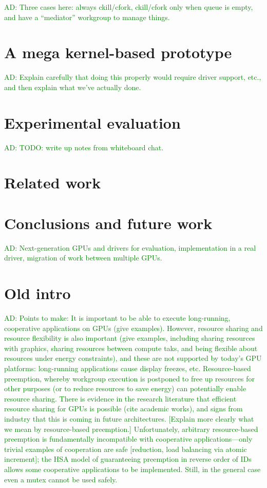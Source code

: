 \documentclass[nocopyrightspace]{sigplanconf-pldi16}
\newcommand{\ADComment}[1]{\textcolor{green}{AD: #1}}
\begin{document}
\ADComment{Three cases here: always ckill/cfork, ckill/cfork only when
  queue is empty, and have a ``mediator'' workgroup to manage things.}


\section{A mega kernel-based prototype}

\ADComment{Explain carefully that doing this properly would require
  driver support, etc., and then explain what we've actually done.}


\section{Experimental evaluation}

\ADComment{TODO: write up notes from whiteboard chat.}


\section{Related work}

\section{Conclusions and future work}

\ADComment{Next-generation GPUs and drivers for evaluation,
  implementation in a real driver, migration of work between multiple
  GPUs.}

\section{Old intro}


\ADComment{Points to make: It is important to be able to execute
  long-running, cooperative applications on GPUs (give examples).
  However, resource sharing and resource flexibility is also important
  (give examples, including sharing resources with graphics, sharing
  resources between compute taks, and being flexible about resources
  under energy constraints), and these are not supported by today's
  GPU platforms: long-running applications cause display freezes, etc.
  Resource-based preemption, whereby workgroup execution is postponed
  to free up resources for other purposes (or to reduce resources to
  save energy) can potentially enable resource sharing.  There is
  evidence in the research literature that efficient resource sharing
  for GPUs is possible (cite academic works), and signs from industry
  that this is coming in future architectures.  [Explain more clearly
    what we mean by resource-based preemption.]  Unfortunately,
  arbitrary resource-based preemption is fundamentally incompatible
  with cooperative applications---only trivial examples of cooperation
  are safe [reduction, load balancing via atomic increment]; the HSA
  model of guaranteeing preemption in reverse order of IDs allows some
  cooperative applications to be implemented.  Still, in the general
  case even a mutex cannot be used safely.}
\end{document}
